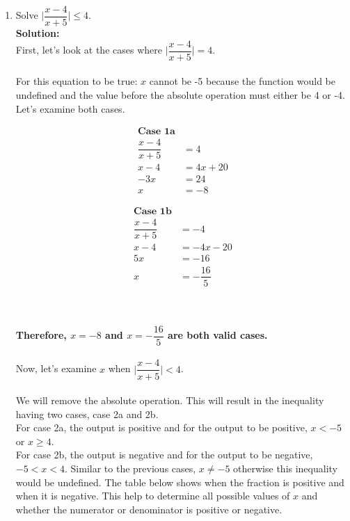 \documentclass[12pt]{book}
\begin{document}
\begin{enumerate}
\newpage

\item Solve $\bigg|\dfrac{x-4}{x+5}\bigg| \le 4$.\\

\textbf{Solution:}\\
First, let's look at the cases where $\bigg|\dfrac{x-4}{x+5}\bigg| = 4$.\\\\
For this equation to be true: $x$ cannot be -5 because the function would be undefined and the value before the absolute operation must either be 4 or -4. Let's examine both cases.\\
\begin{minipage}{.5\textwidth}
    \begin{align*}
    \textbf{Case 1a}\\
        \dfrac{x-4}{x+5} &= 4 \\
        x-4 &= 4x + 20 \\
        -3x &= 24 \\ 
        x &= -8
    \end{align*}      
    \end{minipage}
    \begin{minipage}{.5\textwidth}
    \begin{align*}
    \textbf{Case 1b}\\
        \dfrac{x-4}{x+5} &= -4 \\
        x-4 &= -4x - 20 \\
        5x &= -16 \\ 
        x &= -\dfrac{16}{5}
    \end{align*}
\end{minipage}\\\\
\textbf{Therefore, $x = -8$ and $x = -\dfrac{16}{5}$ are both valid cases.}\\\\
Now, let's examine $x$ when $\bigg|\dfrac{x-4}{x+5}\bigg| < 4$.\\\\
We will remove the absolute operation. This will result in the inequality having two cases, case 2a and 2b.\\
For case 2a, the output is positive and for the output to be positive, $x < -5$ or $x \geq 4$.\\
For case 2b, the output is negative and for the output to be negative, $-5 < x < 4$. Similar to the previous cases, $x \neq -5$ otherwise this inequality would be undefined. The table below shows when the fraction is positive and when it is negative. This help to determine all possible values of $x$ and whether the numerator or denominator is positive or negative.\\\\

\end{enumerate}
\end{document}
